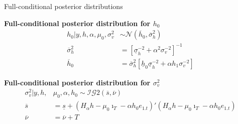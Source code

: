 \documentclass[notes,blackandwhite,mathsans,usenames,dvipsnames]{beamer}
\begin{document}
\begin{frame}{Full-conditional posterior distributions}

\textbf{Full-conditional posterior distribution for $h_0$}
\begin{align*}
h_0| y,h,\alpha,\mu_0,\sigma_v^2 &\sim\mathcal{N}\left(\overline{h}_0,\overline{\sigma}_h^2  \right)\\
\overline{\sigma}_h^2 &= \left[ \underline\sigma_h^{-2} + \alpha^2\sigma_v^{-2} \right]^{-1} \\
\overline{h}_0 &= \overline{\sigma}_h^2\left[ \underline{h}_0\underline\sigma_h^{-2} +  \alpha h_1 \sigma_v^{-2} \right]
\end{align*}

\bigskip\textbf{Full-conditional posterior distribution for $\sigma_v^2$}
\begin{align*}
\sigma_v^2| y,h,&\mu_0,\alpha,h_0 \sim\mathcal{IG}2\left(\overline{s},\overline{\nu}  \right)\\
\overline{s} &= \underline{s} + \left( H_\alpha h-\mu_0\imath_T - \alpha h_0 e_{1.t}\right)'\left( H_\alpha h-\mu_0\imath_T - \alpha h_0 e_{1.t}\right)\\
\overline{\nu} &= \overline{\nu}+T
\end{align*}

\end{frame}
\end{document}
